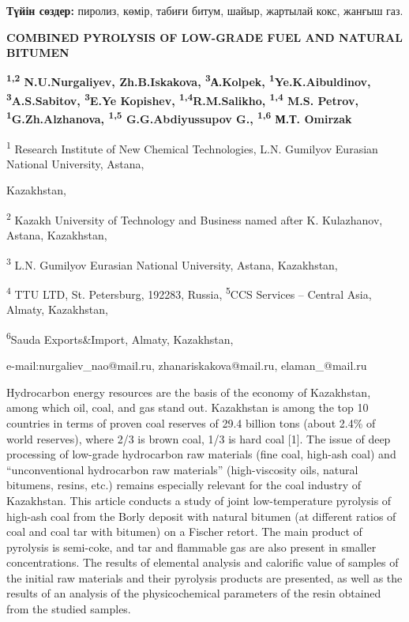 {\bfseries Түйін сөздер:} пиролиз, көмір, табиғи битум, шайыр, жартылай
кокс, жанғыш газ.

\begin{center}
{\large\bfseries COMBINED PYROLYSIS OF LOW-GRADE FUEL AND NATURAL BITUMEN}

{\bfseries \textsuperscript{1,2} N.U.Nurgaliyev, Zh.B.Iskakova,
\textsuperscript{3}А.Kolpek, \textsuperscript{1}Ye.K.Aibuldinov, \textsuperscript{3}A.S.Sabitov, \textsuperscript{3}E.Ye Kopishev, \textsuperscript{1,4}R.M.Salikho, \textsuperscript{1,4} M.S. Petrov, \textsuperscript{1}G.Zh.Alzhanova, \textsuperscript{1,5} G.G.Abdiyussupov G., \textsuperscript{1,6}
М.Т. Omirzak}

\textsuperscript{1} Research Institute of New Chemical Technologies,
L.N. Gumilyov Eurasian National University, Astana,

Kazakhstan,

\textsuperscript{2} Kazakh University of Technology and Business named
after K. Kulazhanov, Astana, Kazakhstan,

\textsuperscript{3} L.N. Gumilyov Eurasian National University, Astana,
Kazakhstan,

\textsuperscript{4} TTU LTD, St. Petersburg, 192283, Russia,
\textsuperscript{5}CCS Services -- Central Asia, Almaty, Kazakhstan,

\textsuperscript{6}Sauda Exports\&Import, Almaty, Kazakhstan,

e-mail:nurgaliev\_nao@mail.ru, zhanariskakova@mail.ru, elaman\_@mail.ru
\end{center}

Hydrocarbon energy resources are the basis of the economy of Kazakhstan,
among which oil, coal, and gas stand out. Kazakhstan is among the top 10
countries in terms of proven coal reserves of 29.4 billion tons (about
2.4\% of world reserves), where 2/3 is brown coal, 1/3 is hard coal
{[}1{]}. The issue of deep processing of low-grade hydrocarbon raw
materials (fine coal, high-ash coal) and ``unconventional hydrocarbon
raw materials'' (high-viscosity oils, natural bitumens, resins, etc.)
remains especially relevant for the coal industry of Kazakhstan. This
article conducts a study of joint low-temperature pyrolysis of high-ash
coal from the Borly deposit with natural bitumen (at different ratios of
coal and coal tar with bitumen) on a Fischer retort. The main product of
pyrolysis is semi-coke, and tar and flammable gas are also present in
smaller concentrations. The results of elemental analysis and calorific
value of samples of the initial raw materials and their pyrolysis
products are presented, as well as the results of an analysis of the
physicochemical parameters of the resin obtained from the studied
samples.

